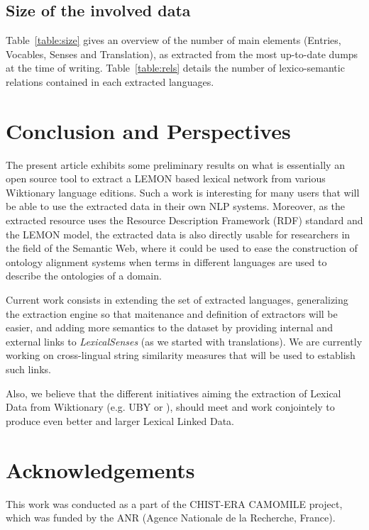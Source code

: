 \documentclass[10pt, a4paper]{article}
\begin{document}
\subsection{Size of the involved data}

 Table~\ref{table:size} gives an overview of the number of main elements (Entries, Vocables, Senses and Translation), as extracted from the most up-to-date dumps at the time of writing. Table~\ref{table:rels} details the number of lexico-semantic relations contained in each extracted languages.



\section{Conclusion and Perspectives}

The present article exhibits some preliminary results on what is essentially an open source tool to extract a LEMON based lexical network from various Wiktionary language editions. Such a work is interesting for many users that will be able to use the extracted data in their own NLP systems. Moreover, as the extracted resource uses the Resource Description Framework (RDF) standard and the LEMON model, the extracted data is also directly usable for researchers in the field of the Semantic Web, where it could be used to ease the construction of ontology alignment systems when terms in different languages are used to describe the ontologies of a domain.

Current work consists in extending the set of extracted languages, generalizing the extraction engine so that maitenance and definition of extractors will be easier, and adding more semantics to the dataset by providing internal and external links to \textit{LexicalSenses} (as we started with translations). We are currently working on cross-lingual string similarity measures that will be used to establish such links.

Also, we believe that the different initiatives aiming the extraction of Lexical Data from Wiktionary (e.g. UBY \cite{TUD-CS-2012-0008} or \cite{HellmannSebastianandBrekleJonasandAuer}), should meet and work conjointely to produce even better and larger Lexical Linked Data.

\section{Acknowledgements}

This work was conducted as a part of the CHIST-ERA CAMOMILE project, which was funded by the ANR (Agence Nationale de la Recherche, France).


\end{document}
